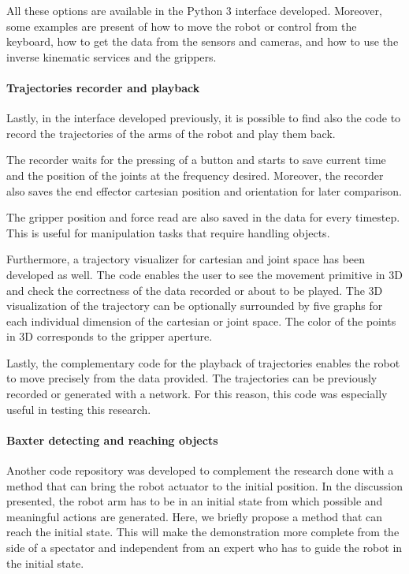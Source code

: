 All these options are available in the Python 3 interface developed. Moreover, some examples are present of how to move the robot or control from the keyboard, how to get the data from the sensors and cameras, and how to use the inverse kinematic services and the grippers. 

\paragraph{Trajectories recorder and playback} Lastly, in the interface developed previously, it is possible to find also the code to record the trajectories of the arms of the robot and play them back. 

The recorder waits for the pressing of a button and starts to save current time and the position of the joints at the frequency desired. Moreover, the recorder also saves the end effector cartesian position and orientation for later comparison. 

The gripper position and force read are also saved in the data for every timestep. This is useful for manipulation tasks that require handling objects. 

Furthermore, a trajectory visualizer for cartesian and joint space has been developed as well. The code enables the user to see the movement primitive in 3D and check the correctness of the data recorded or about to be played. The 3D visualization of the trajectory can be optionally surrounded by five graphs for each individual dimension of the cartesian or joint space. The color of the points in 3D corresponds to the gripper aperture. 

Lastly, the complementary code for the playback of trajectories enables the robot to move precisely from the data provided. The trajectories can be previously recorded or generated with a network. For this reason, this code was especially useful in testing this research. 

\paragraph{Baxter detecting and reaching objects} 
Another code repository was developed to complement the research done with a method that can bring the robot actuator to the initial position. In the discussion presented, the robot arm has to be in an initial state from which possible and meaningful actions are generated. Here, we briefly propose a method that can reach the initial state. This will make the demonstration more complete from the side of a spectator and independent from an expert who has to guide the robot in the initial state.

